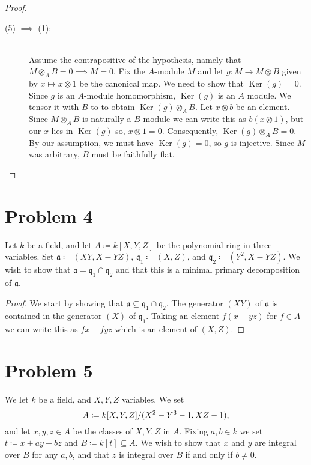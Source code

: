 \documentclass{article}
\newcommand{\q}{\mathfrak{q}}
\newcommand{\tensor}{\otimes}
\renewcommand{\a}{\mathfrak{a}}
\DeclareMathOperator{\Ker}{Ker}
\begin{document}
\begin{proof}
\begin{description}
            \item [(5) $\implies$ (1):]\hfill\\
                Assume the contrapositive of the hypothesis, namely that
                $M\tensor_A B = 0 \implies M = 0$. Fix the $A$-module $M$ and
                let $g: M \to M \tensor B$ given by $x \mapsto x \tensor 1$ be
                the canonical map. We need to show that $\Ker(g) = 0$.  Since
                $g$ is an $A$-module homomorphism, $\Ker(g)$ is an $A$ module.
                We tensor it with $B$ to to obtain $\Ker(g) \tensor_A B$. Let
                $x \tensor b$ be an element. Since $M \tensor_A B$ is naturally
                a $B$-module we can write this as $b(x \tensor 1)$, but our $x$
                lies in $\Ker(g)$ so, $x \tensor 1 = 0$.  Consequently,
                $\Ker(g) \tensor_A B = 0$. By our assumption, we must have
                $\Ker(g) = 0$, so $g$ is injective. Since $M$ was arbitrary,
                $B$ must be faithfully flat.
        \end{description}
    \end{proof}

\section*{Problem 4}
\label{sec:problem_4}

Let $k$ be a field, and let $A \coloneqq k[X, Y, Z]$ be the polynomial
ring in three variables. Set $\a \coloneqq (XY, X-YZ)$, $\q_1 \coloneqq
(X, Z)$, and $\q_2 \coloneqq (Y^2, X-YZ)$. We wish to show that $\a = \q_1
\cap \q_2$ and that this is a minimal primary decomposition of $\a$.
\begin{proof}
    We start by showing that $\a \subseteq \q_1 \cap \q_2$. The generator
    $(XY)$ of $\a$ is contained in the generator $(X)$ of $\q_1$. Taking
    an element $f(x - yz)$ for $f \in A$ we can write this as $fx - fyz$
    which is an element of $(X, Z)$.
\end{proof}

\section*{Problem 5}
We let $k$ be a field, and $X, Y, Z$ variables. We set
\begin{equation}
    \notag
    A \coloneqq k[X, Y, Z] / (X^2- Y^3 - 1, XZ - 1), 
\end{equation}
and let $x, y, z \in A$ be the classes of $X, Y, Z$ in $A$. Fixing $a, b
\in k$ we set $t \coloneqq x + ay + bz$ and $B \coloneqq k[t] \subseteq
A$. We wish to show that $x$ and $y$ are integral over $B$ for any $a, b$,
and that $z$ is integral over $B$ if and only if $b \neq 0$.
\end{document}

